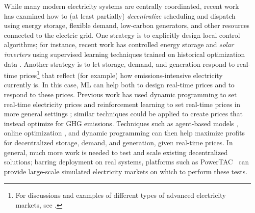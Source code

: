 \documentclass[11pt]{report}
\begin{document}
While many modern electricity systems are centrally coordinated, recent work has examined how to (at least partially) \emph{decentralize} scheduling and dispatch using energy storage, flexible demand, low-carbon generators, and other resources connected to the electric grid.
One strategy is to explicitly design local control algorithms; for instance, recent work has controlled energy storage and \emph{solar inverters} using supervised learning techniques trained on historical optimization data \cite{dobbe2019towards, karagiannopoulos2019data, karagiannopoulos2019data2, dobbe2017fully}.
Another strategy is to let storage, demand, and generation respond to real-time
prices\footnote{For discussions and examples of different types of advanced electricity markets, see \cite{lian2018transactive, lian2018transactive2, zhang2017machine, camusenergy}.} that reflect (for example) how emissions-intensive electricity currently is. 
In this case, ML can help both to design real-time prices and to respond to these prices.
Previous work has used dynamic programming to set real-time electricity prices \cite{borgs2014optimal} and reinforcement learning to set real-time prices in more general settings \cite{maestre}; similar techniques could be applied to create prices that instead optimize for GHG emissions. Techniques such as agent-based models \cite{ramchurn2011agent2, ramchurn2011agent1, deindl2008load, ygge1999homebots}, online optimization \cite{buchbinder2011online}, and dynamic programming \cite{salas2017benchmarking} can then help maximize profits for decentralized storage, demand, and generation, given real-time prices.
In general, much more work is needed to test and scale existing decentralized solutions; barring deployment on real systems, platforms such as PowerTAC~\cite{powertac} can provide large-scale simulated electricity markets on which to perform these tests.
\end{document}

